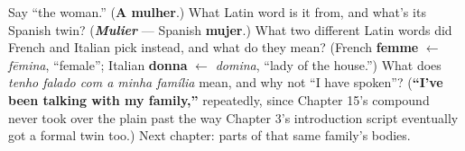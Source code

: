 \begin{tcolorbox}[breakable,colback=teal!4,colframe=teal!35!black,title={Before you move on}]
Say \textquotedblleft{}the woman.\textquotedblright{} (\textbf{A mulher}.) What Latin word is it from, and what's its Spanish twin? (\emph{\textbf{Mulier}} — Spanish \textbf{mujer}.) What two different Latin words did French and Italian pick instead, and what do they mean? (French \textbf{femme} $\leftarrow$ \emph{fēmina}, \textquotedblleft{}female\textquotedblright{}; Italian \textbf{donna} $\leftarrow$ \emph{domina}, \textquotedblleft{}lady of the house.\textquotedblright{}) What does \emph{tenho falado com a minha família} mean, and why not \textquotedblleft{}I have spoken\textquotedblright{}? (\textbf{\textquotedblleft{}I've been talking with my family,\textquotedblright{}} repeatedly, since Chapter 15's compound never took over the plain past the way Chapter 3's introduction script eventually got a formal twin too.) Next chapter: parts of that same family's bodies.
\end{tcolorbox}

